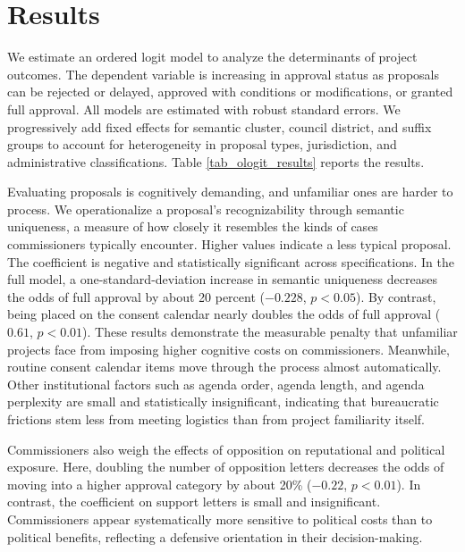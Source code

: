 \section{Results}\label{sec_results}

We estimate an ordered logit model to analyze the determinants of project outcomes. The dependent variable is increasing in approval status as proposals can be rejected or delayed, approved with conditions or modifications, or granted full approval. All models are estimated with robust standard errors. We progressively add fixed effects for semantic cluster, council district, and suffix groups to account for heterogeneity in proposal types, jurisdiction, and administrative classifications. Table \ref{tab_ologit_results} reports the results. 

Evaluating proposals is cognitively demanding, and unfamiliar ones are harder to process. We operationalize a proposal's recognizability through semantic uniqueness, a measure of how closely it resembles the kinds of cases commissioners typically encounter. Higher values indicate a less typical proposal. The coefficient is negative and statistically significant across specifications. In the full model, a one-standard-deviation increase in semantic uniqueness decreases the odds of full approval by about 20 percent ($-0.228$, $p<0.05$). By contrast, being placed on the consent calendar nearly doubles the odds of full approval ($0.61$, $p<0.01$). These results demonstrate the measurable penalty that unfamiliar projects face from imposing higher cognitive costs on commissioners. Meanwhile, routine consent calendar items move through the process almost automatically. Other institutional factors such as agenda order, agenda length, and agenda perplexity are small and statistically insignificant, indicating that bureaucratic frictions stem less from meeting logistics than from project familiarity itself.

Commissioners also weigh the effects of opposition on reputational and political exposure. Here, doubling the number of opposition letters decreases the odds of moving into a higher approval category by about 20\% ($-0.22$, $p<0.01$). In contrast, the coefficient on support letters is small and insignificant. Commissioners appear systematically more sensitive to political costs than to political benefits, reflecting a defensive orientation in their decision-making.

